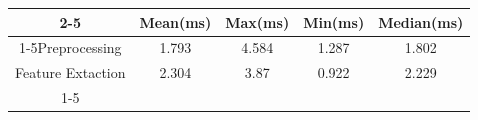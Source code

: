 \documentclass{standalone}
\begin{document}
 
 \begin{tabular}{|c |c |c |c |c |}
\cline{2-5}\cline{2-5} \multicolumn{1}{c |}{ } & Mean(ms) & Max(ms) & Min(ms) & Median(ms)\\ 
\cline{1-5}Preprocessing & 1.793 & 4.584 & 1.287 & 1.802\\ 
 \hhline{|=|=|=|=|=|}Feature Extaction & 2.304 & 3.87 & 0.922 & 2.229\\ 
 \cline{1-5}\hline \end{tabular}
 
\end{document}
